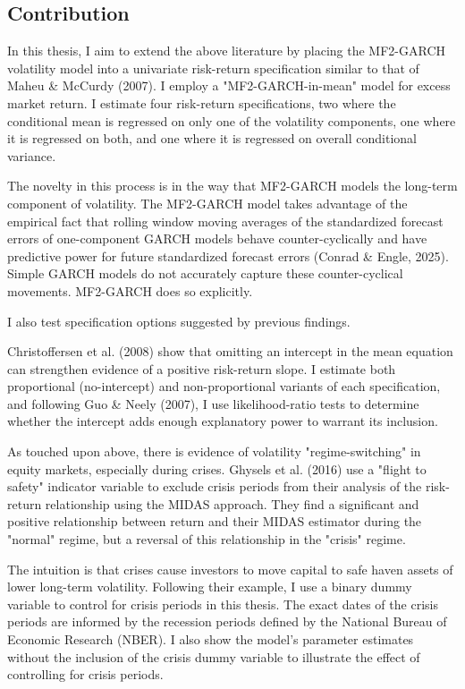 \documentclass[12pt]{article}
\begin{document}
\subsection{Contribution}
In this thesis, I aim to extend the above literature by placing the MF2-GARCH volatility model into a univariate risk-return specification similar to that of Maheu \& McCurdy (2007). I employ a "MF2-GARCH-in-mean" model for excess market return. I estimate four risk-return specifications, two where the conditional mean is regressed on only one of the volatility components, one where it is regressed on both, and one where it is regressed on overall conditional variance.\par
The novelty in this process is in the way that MF2-GARCH models the long-term component of volatility. The MF2-GARCH model takes advantage of the empirical fact that rolling window moving averages of the standardized forecast errors of one-component GARCH models behave counter-cyclically and have predictive power for future standardized forecast errors (Conrad \& Engle, 2025). Simple GARCH models do not accurately capture these counter-cyclical movements. MF2-GARCH does so explicitly.\par
I also test specification options suggested by previous findings.\par
Christoffersen et al. (2008) show that omitting an intercept in the mean equation can strengthen evidence of a positive risk-return slope. I estimate both proportional (no-intercept) and non-proportional variants of each specification, and following Guo \& Neely (2007), I use likelihood-ratio tests to determine whether the intercept adds enough explanatory power to warrant its inclusion.\par
As touched upon above, there is evidence of volatility "regime-switching" in equity markets, especially during crises. Ghysels et al. (2016) use a "flight to safety" indicator variable to exclude crisis periods from their analysis of the risk-return relationship using the MIDAS approach. They find a significant and positive relationship between return and their MIDAS estimator during the "normal" regime, but a reversal of this relationship in the "crisis" regime.\par
The intuition is that crises cause investors to move capital to safe haven assets of lower long-term volatility. Following their example, I use a binary dummy variable to control for crisis periods in this thesis. The exact dates of the crisis periods are informed by the recession periods defined by the National Bureau of Economic Research (NBER). I also show the model's parameter estimates without the inclusion of the crisis dummy variable to illustrate the effect of controlling for crisis periods.\par
\end{document}
